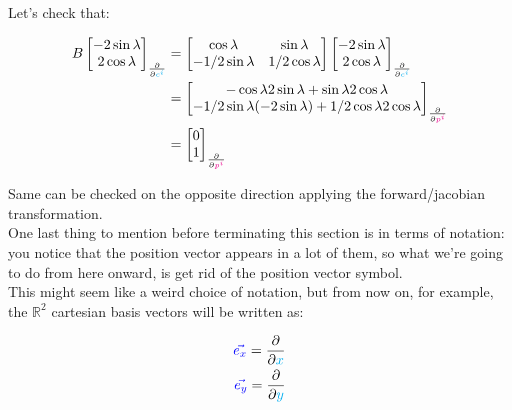 Let's check that:

\begin{align*}
    B \begin{bmatrix}
        -2\sin\lambda\\
        2 \cos\lambda
    \end{bmatrix}_{\frac{\partial }{\partial \begingroup\color{cyan}c^i\endgroup}} &= 
     \begin{bmatrix}
        \cos\lambda & \sin\lambda\\
        -1/2\sin\lambda & 1/2\cos\lambda
    \end{bmatrix} 
    \begin{bmatrix}
        -2\sin\lambda\\
        2 \cos\lambda
    \end{bmatrix}_{\frac{\partial }{\partial \begingroup\color{cyan}c^i\endgroup}}\\ 
    &= \begin{bmatrix}
        -\cos\lambda 2\sin\lambda + \sin\lambda 2\cos\lambda\\
        -1/2 \sin\lambda (-2 \sin\lambda) + 1/2 \cos\lambda 2 \cos\lambda
    \end{bmatrix}_{\frac{\partial}{\partial \begingroup\color{magenta}p^i\endgroup}}\\
    & = \begin{bmatrix}
        0\\
        1
    \end{bmatrix}_{\frac{\partial}{\partial \begingroup\color{magenta}p^i\endgroup}}
\end{align*}

Same can be checked on the opposite direction applying the forward/jacobian transformation.\\

One last thing to mention before terminating this section is in terms of notation: you notice that 
the position vector appears in a lot of them, so what we're going to do from here onward, is get rid of the 
position vector symbol.\\
This might seem like a weird choice of notation, but from now on, for example, the $\mathbb{R}^2$ cartesian basis vectors will be 
written as:

\begin{align*}
    \begingroup\color{blue}\vec{e_x}\endgroup = \frac{\partial}{\partial \begingroup\color{cyan}x\endgroup}\\
    \begingroup\color{blue}\vec{e_y}\endgroup = \frac{\partial}{\partial \begingroup\color{cyan}y\endgroup}
\end{align*}

